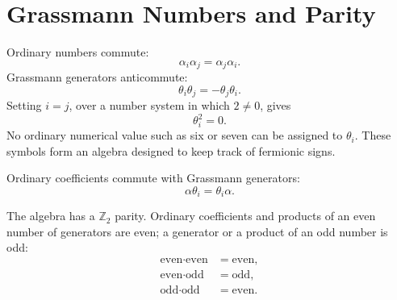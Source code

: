 \section{Grassmann Numbers and Parity}

Ordinary numbers commute:
\begin{equation}
\alpha_i\alpha_j=\alpha_j\alpha_i.
\end{equation}
Grassmann generators anticommute:
\begin{equation}
\theta_i\theta_j=-\theta_j\theta_i.
\end{equation}
Setting \(i=j\), over a number system in which \(2\neq0\), gives
\begin{equation}
\theta_i^2=0.
\end{equation}
No ordinary numerical value such as six or seven can be assigned to \(\theta_i\). These symbols form an algebra designed to keep track of fermionic signs.

Ordinary coefficients commute with Grassmann generators:
\begin{equation}
\alpha\theta_i=\theta_i\alpha.
\end{equation}

\begin{classroomqa}
\end{classroomqa}

The algebra has a \(\mathbb Z_2\) parity. Ordinary coefficients and products of an even number of generators are even; a generator or a product of an odd number is odd:
\begin{equation}
\begin{aligned}
\text{even}\cdot\text{even}&=\text{even},\\
\text{even}\cdot\text{odd}&=\text{odd},\\
\text{odd}\cdot\text{odd}&=\text{even}.
\end{aligned}
\end{equation}

\begin{classroomqa}
\end{classroomqa}

